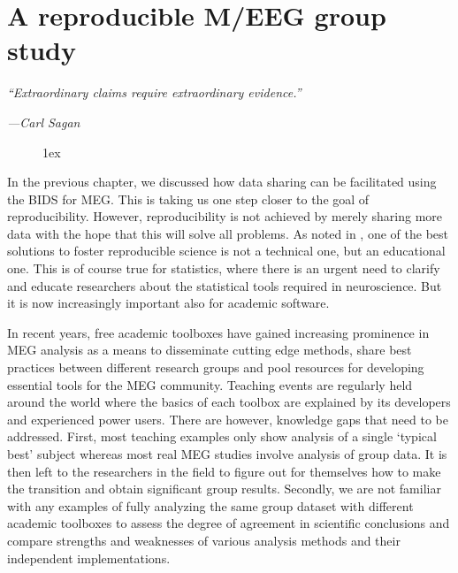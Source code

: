 \chapter{A reproducible M/EEG group study}
\label{chapter:group_study}

\vspace{20pt}
\epigraph{\small\itshape ``Extraordinary claims require extraordinary evidence.''}
{\small\textit{---Carl Sagan}}

\begin{figure}[ht!]
\centering
\begingroup
\etocstandardlines
\renewcommand{\etocbelowtocskip}{0pt\relax}
\fboxsep1ex
\localtableofcontents
\endgroup
\end{figure}

In the previous chapter, we discussed how data sharing can be facilitated using the \ac{BIDS} for \ac{MEG}. This is taking us one step closer to the goal of reproducibility. However, reproducibility is not achieved by merely sharing more data with the hope that this will solve all problems. As noted in \citet{baker20161}, one of the best solutions to foster reproducible science is not a technical one, but an educational one. This is of course true for statistics, where there is an urgent need to clarify and educate researchers about the statistical tools required in neuroscience. But it is now increasingly important also for academic software.

In recent years, free academic toolboxes have gained increasing prominence in \ac{MEG} analysis as a means to disseminate cutting edge methods, share best practices between different research groups and pool resources for developing essential tools for the \ac{MEG} community. Teaching events are regularly held around the world where the basics of each toolbox are explained by its  developers and experienced power users. There are however, knowledge gaps that need to be addressed. First, most teaching examples only show analysis of a single ‘typical best’ subject whereas most real MEG studies involve analysis of group data. It is then left to the researchers in the field to figure out for themselves how to make the transition and obtain significant group results. Secondly, we are not familiar with any examples of fully analyzing the same group dataset with different academic toolboxes to assess the degree of agreement in scientific conclusions and compare strengths and weaknesses of various analysis methods and their independent implementations.

